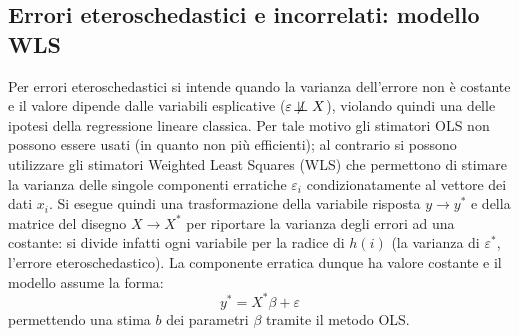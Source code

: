 \documentclass[a4page, 11pt]{article} %
\def\dep{\not\!\perp\!\!\!\perp}  %
\begin{document}
\subsection*{Errori eteroschedastici e incorrelati: modello WLS}
Per errori eteroschedastici si intende quando la varianza dell’errore non è costante e il valore dipende dalle variabili esplicative ($\varepsilon \dep X$), violando quindi una delle ipotesi della regressione lineare classica.
Per tale motivo gli stimatori OLS non possono essere usati (in quanto non più efficienti); al contrario si possono utilizzare gli stimatori Weighted Least Squares (WLS) che permettono di stimare la varianza delle singole componenti erratiche $\varepsilon_i$ condizionatamente al vettore dei dati $x_i$.
Si esegue quindi una trasformazione della variabile risposta $y \rightarrow y^*$ e della matrice del disegno $X \rightarrow X^*$ per riportare la varianza degli errori ad una costante: si divide infatti ogni variabile per la radice di $h(i)$ (la varianza di $\varepsilon^*$, l'errore eteroschedastico).
La componente erratica dunque ha valore costante e il modello assume la forma:
\begin{equation*}
y^* = X^*\beta + \varepsilon
\end{equation*}
permettendo una stima $b$ dei parametri $\beta$ tramite il metodo OLS.
\end{document}
